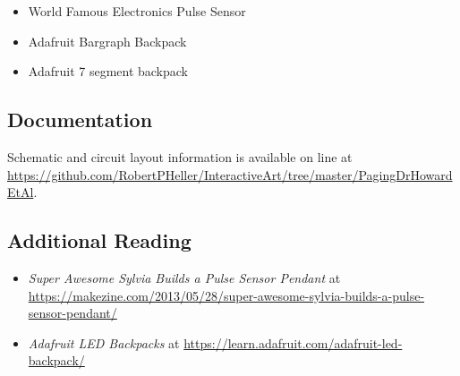 \begin{itemize}
\item World Famous Electronics Pulse Sensor
\item Adafruit Bargraph Backpack
\item Adafruit 7 segment backpack
\end{itemize}

\subsection*{Documentation}

Schematic and circuit layout information is available on line at 
\url{https://github.com/RobertPHeller/InteractiveArt/tree/master/PagingDrHowardEtAl}.

\subsection*{Additional Reading}

\begin{itemize}
\item \textit{Super Awesome Sylvia Builds a Pulse Sensor Pendant} at 
\url{https://makezine.com/2013/05/28/super-awesome-sylvia-builds-a-pulse-sensor-pendant/} 
\item \textit{Adafruit LED Backpacks} at 
\url{https://learn.adafruit.com/adafruit-led-backpack/} 
\end{itemize}
